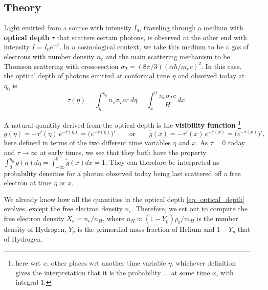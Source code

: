 \documentclass[10pt,a4paper]{article}
\begin{document}
\subsection{Theory}

Light emitted from a source with intensity $I_0$,
traveling through a medium with \textbf{optical depth} $\tau$ that scatters certain photons,
is observed at the other end with intensity $I = I_0 e^{-\tau}$.
In a cosmological context, we take this medium to be a gas of electrons with number density $n_e$
and the main scattering mechanism to be Thomson scattering with cross-section $\sigma_T = (8\pi/3) (\alpha \hbar / m_e c)^2$.
In this case, the optical depth of photons emitted at conformal time $\eta$ and observed today at $\eta_0$ is
\begin{equation}
	\tau(\eta) = \int_\eta^{\eta_0} n_e \sigma_T a c \, d\eta = \int_x^0 \frac{n_e \sigma_T c}{H} \, dx.
\label{eq_optical_depth}
\end{equation}

A natural quantity derived from the optical depth is the \textbf{visibility function}
\footnote{here wrt $x$, other places wrt another time variable $\eta$. whichever definition gives the interpretation that it is the probability ... at some time $x$, with integral $1$.}
\begin{equation}
	g(\eta) = -\tau'(\eta) \, e^{-\tau(\eta)} = \Big( e^{-\tau(\eta)} \Big)'
	\qquad \text{or} \qquad
	\tilde{g}(x) = -\tau'(x) \, e^{-\tau(x)} = \Big( e^{-\tau(x)} \Big)',
\label{eq_visibility_function}
\end{equation}
here defined in terms of the two different time variables $\eta$ and $x$.
As $\tau=0$ today and $\tau \rightarrow \infty$ at early times,
we see that they both have the property $\int_0^{\eta_0} g(\eta) d\eta = \int_{-\infty}^0 \tilde{g}(x) dx = 1$.
They can therefore be interpreted as probability densities for a photon observed today being last scattered off a free electron at time $\eta$ or $x$.

We already know how all the quantities in the optical depth \eqref{eq_optical_depth} evolves, except the free electron density $n_e$.
Therefore, we set out to compute the free electron density $X_e = n_e / n_H$,
where $n_H \approx (1-Y_p) \rho_b / m_H$ is the number density of Hydrogen,
$Y_p$ is the primordial mass fraction of Helium
and $1-Y_p$ that of Hydrogen.
\end{document}
